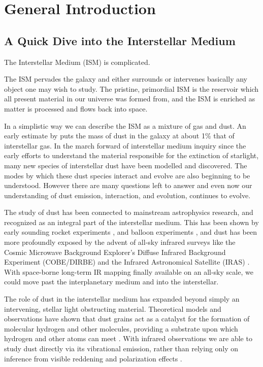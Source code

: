 \chapter{General Introduction\\
\label{chap:Introduction}}

\section{A Quick Dive into the Interstellar Medium}
The Interstellar Medium (ISM) is complicated. 

The ISM pervades the galaxy and either surrounds or intervenes basically any object one may wish to study. The pristine, primordial ISM is the reservoir which all present material in our universe was formed from, and the ISM is enriched as matter is processed and flows back into space.

In a simplistic way we can describe the ISM as a mixture of gas and dust. An early estimate by \cite{knapp74} puts the mass of dust in the galaxy at about 1\% that of interstellar gas. In the march forward of interstellar medium inquiry since the early efforts to understand the material responsible for the extinction of starlight, many new species of interstellar dust have been modelled and discovered.  The modes by which these dust species interact and evolve are also beginning to be understood. However there are many questions left to answer and even now our understanding of dust emission, interaction, and evolution, continues to evolve.

The study of dust has been connected to mainstream astrophysics research, and recognized as an integral part of the interstellar medium. This has been shown by early sounding rocket experiments \citep{wolstencroft67,soifer71}, and balloon experiments \citep{muehlner70,emerson73}, and dust has been more profoundly exposed by the advent of all-sky infrared surveys like the  Cosmic Microwave Background Explorer's Diffuse Infrared Background Experiment (COBE/DIRBE) \citep{sodroski94} and the Infrared Astronomical Satellite (IRAS) \citep{iras84}. With space-borne long-term IR mapping finally available on an all-sky scale, we could move past the interplanetary medium and into the interstellar.

The role of dust in the interstellar medium has expanded beyond simply an intervening, stellar light obstructing material. Theoretical models and observations have shown that dust grains act as a catalyst for the formation of molecular hydrogen and other molecules, providing a substrate upon which hydrogen and other atoms can meet \citep{iglesias77,burke83}. With infrared observations we are able to study dust directly via its vibrational emission, rather than relying only on inference from visible reddening and polarization effects \citep{davis51,platt56, carrasco73}.

